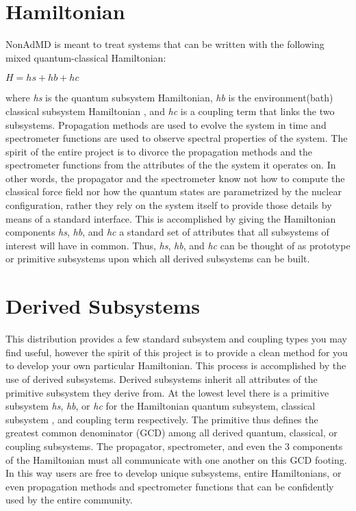 \hypertarget{_overview_Hamiltonian}{}\section{Hamiltonian}\label{_overview_Hamiltonian}
Non\-Ad\-M\-D is meant to treat systems that can be written with the following mixed quantum-\/classical Hamiltonian\-:\par
 $H=hs+hb+hc$\par
 where {\itshape hs} is the quantum subsystem Hamiltonian, {\itshape hb} is the environment(bath) classical subsystem Hamiltonian , and {\itshape hc} is a coupling term that links the two subsystems. Propagation methods are used to evolve the system in time and spectrometer functions are used to observe spectral properties of the system. The spirit of the entire project is to divorce the propagation methods and the spectrometer functions from the attributes of the the system it operates on. In other words, the propagator and the spectrometer know not how to compute the classical force field nor how the quantum states are parametrized by the nuclear configuration, rather they rely on the system itself to provide those details by means of a standard interface. This is accomplished by giving the Hamiltonian components {\itshape hs}, {\itshape hb}, and {\itshape hc} a standard set of attributes that all subsystems of interest will have in common. Thus, {\itshape hs}, {\itshape hb}, and {\itshape hc} can be thought of as prototype or primitive subsystems upon which all derived subsystems can be built.\hypertarget{_overview_Derived_Subsystems}{}\section{Derived Subsystems}\label{_overview_Derived_Subsystems}
This distribution provides a few standard subsystem and coupling types you may find useful, however the spirit of this project is to provide a clean method for you to develop your own particular Hamiltonian. This process is accomplished by the use of derived subsystems. Derived subsystems inherit all attributes of the primitive subsystem they derive from. At the lowest level there is a primitive subsystem {\itshape hs}, {\itshape hb}, or {\itshape hc} for the Hamiltonian quantum subsystem, classical subsystem , and coupling term respectively. The primitive thus defines the greatest common denominator (G\-C\-D) among all derived quantum, classical, or coupling subsystems. The propagator, spectrometer, and even the 3 components of the Hamiltonian must all communicate with one another on this G\-C\-D footing. In this way users are free to develop unique subsystems, entire Hamiltonians, or even propagation methods and spectrometer functions that can be confidently used by the entire community.

